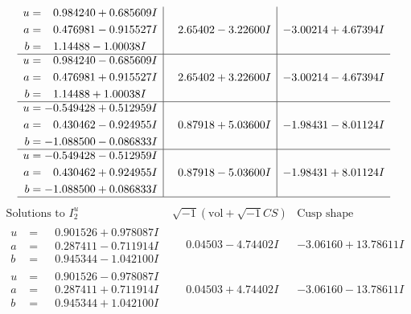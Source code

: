 \documentclass[1p]{elsarticle_modified}
\theoremstyle{definition}
\newcommand{\I}{\sqrt{-1}}
\begin{document}
$$\begin{array}{c|c|c}
\begin{aligned}
u &= \phantom{-}0.984240 + 0.685609 I \\
a &= \phantom{-}0.476981 - 0.915527 I \\
b &= \phantom{-}1.14488 - 1.00038 I\end{aligned}
 & \phantom{-}2.65402 - 3.22600 I & -3.00214 + 4.67394 I \\ \hline\begin{aligned}
u &= \phantom{-}0.984240 - 0.685609 I \\
a &= \phantom{-}0.476981 + 0.915527 I \\
b &= \phantom{-}1.14488 + 1.00038 I\end{aligned}
 & \phantom{-}2.65402 + 3.22600 I & -3.00214 - 4.67394 I \\ \hline\begin{aligned}
u &= -0.549428 + 0.512959 I \\
a &= \phantom{-}0.430462 - 0.924955 I \\
b &= -1.088500 - 0.086833 I\end{aligned}
 & \phantom{-}0.87918 + 5.03600 I & -1.98431 - 8.01124 I \\ \hline\begin{aligned}
u &= -0.549428 - 0.512959 I \\
a &= \phantom{-}0.430462 + 0.924955 I \\
b &= -1.088500 + 0.086833 I\end{aligned}
 & \phantom{-}0.87918 - 5.03600 I & -1.98431 + 8.01124 I\\
 \hline 
 \end{array}$$\newpage$$\begin{array}{c|c|c}  
\text{Solutions to }I^u_{2}& \I (\text{vol} + \sqrt{-1}CS) & \text{Cusp shape}\\
 \hline 
\begin{aligned}
u &= \phantom{-}0.901526 + 0.978087 I \\
a &= \phantom{-}0.287411 - 0.711914 I \\
b &= \phantom{-}0.945344 - 1.042100 I\end{aligned}
 & \phantom{-}0.04503 - 4.74402 I & -3.06160 + 13.78611 I \\ \hline\begin{aligned}
u &= \phantom{-}0.901526 - 0.978087 I \\
a &= \phantom{-}0.287411 + 0.711914 I \\
b &= \phantom{-}0.945344 + 1.042100 I\end{aligned}
 & \phantom{-}0.04503 + 4.74402 I & -3.06160 - 13.78611 I \\ \hline\begin{aligned}

\end{aligned}
\end{array}$$
\end{document}
